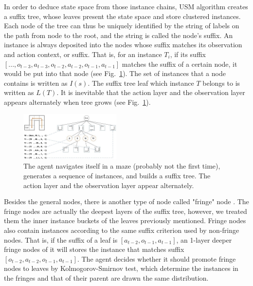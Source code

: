 \documentclass[conference]{IEEEtran}
\begin{document}
	In order to deduce state space from those instance chains, USM algorithm creates a suffix tree,
	whose leaves present the state space and store clustered instances. Each node of the tree
	can thus be uniquely identified by the string of labels on the path from node to the root,
	and the string is called the node’s suffix. An instance is always deposited into the
	nodes whose suffix matches its observation and action context, or suffix. That is,
	for an instance $T_i$, if its suffix $[..., o_{t-3}, a_{t-3}, o_{t-2}, a_{t-2}, o_{t-1}, a_{t-1}]$
	matches the suffix of a certain node, it would be put into that node (see Fig.~\ref{fig:suffix tree}).
	The set of instances that a node contains is written as $I(s)$. The suffix tree leaf which
	instance $T$ belongs to is written as $L(T)$. It is inevitable that the action layer and
	the observation layer appears alternately when tree grows (see Fig.~\ref{fig:suffix tree}).
	
	
	
	\begin{figure}[b]
		\centering
		\includegraphics[width=0.45\textwidth]{usm_sample.jpg}
		\caption{The agent navigates itself in a maze (probably not the first time), generates
			a sequence of instances, and builds a suffix tree. The action layer and
			the observation layer appear alternately.}
		\label{fig:suffix tree}
	\end{figure}
	
	
	
	Besides the general nodes, there is another type of node called "fringe" node \cite{mccallum1995instance}.
	The fringe nodes are actually the deepest layers of the suffix tree, however, we treated them
	the inner instance buckets of the leaves previously mentioned. Fringe nodes also contain
	instances according to the same suffix criterion used by non-fringe nodes. That is, 
	if the suffix of a leaf is $[a_{t-2}, o_{t-1}, a_{t-1}]$, an 1-layer deeper fringe nodes of it
	will stores the instance that matches suffix $[o_{t-2}, a_{t-2}, o_{t-1}, a_{t-1}]$. The agent decides
	whether it should promote fringe nodes to leaves by Kolmogorov-Smirnov test, which determine the
	instances in the fringes and that of their parent are drawn the same distribution.
	
\end{document}
